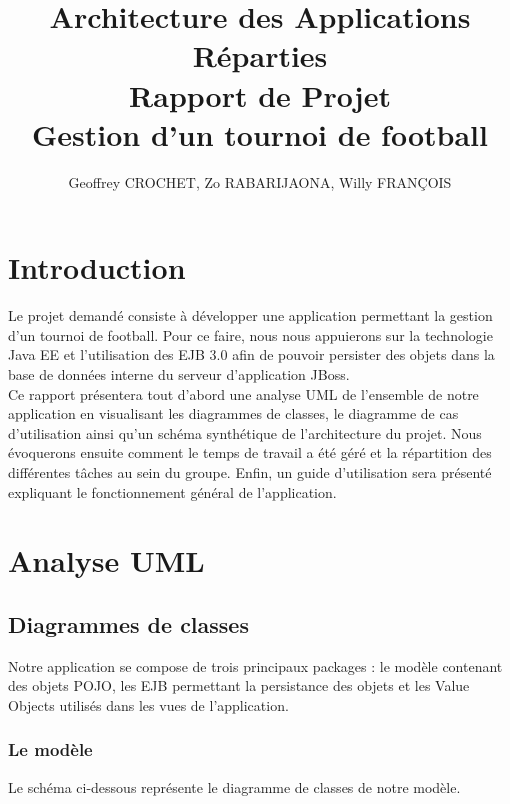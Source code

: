 \documentclass[10pt]{report}
\title{Architecture des Applications Réparties\\ Rapport de Projet\\ Gestion d'un tournoi de football}
\author{Geoffrey CROCHET, Zo RABARIJAONA, Willy FRANÇOIS}
\begin{document}
\maketitle


\newpage

\tableofcontents


\newpage
\chapter*{Introduction}


Le projet demandé consiste à développer une application permettant la gestion d'un tournoi de football. Pour ce faire, nous nous appuierons sur la technologie Java EE et l'utilisation des EJB 3.0 afin de pouvoir persister des objets dans la base de données interne du serveur d'application JBoss.
\\

Ce rapport présentera tout d'abord une analyse UML de l'ensemble de notre application en visualisant les diagrammes de classes, le diagramme de cas d'utilisation ainsi qu'un schéma synthétique de l'architecture du projet. Nous évoquerons ensuite comment le temps de travail a été géré et la répartition des différentes tâches au sein du groupe. Enfin, un guide d'utilisation sera présenté expliquant le fonctionnement général de l'application.

\chapter{Analyse UML}
\section{Diagrammes de classes}


Notre application se compose de trois principaux packages : le modèle contenant des objets POJO, les EJB permettant la persistance des objets et les Value Objects utilisés dans les vues de l'application.


\subsection{Le modèle}

Le schéma ci-dessous représente le diagramme de classes de notre modèle.
\end{document}

